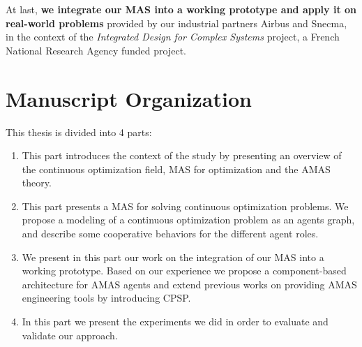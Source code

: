 At last, \textbf{we integrate our MAS into a working prototype and apply it on real-world problems} provided by our industrial partners Airbus and Snecma, in the context of the \emph{Integrated Design for Complex Systems} project, a French National Research Agency funded project.

\pagebreak
\section*{Manuscript Organization}
This thesis is divided into 4 parts:
\begin{enumerate}[P{a}rt I.] %
\item This part introduces the context of the study by presenting an overview of the continuous optimization field, MAS for optimization and the AMAS theory.
\item This part presents a MAS for solving continuous optimization problems. We propose a modeling of a continuous optimization problem as an agents graph, and describe some cooperative behaviors for the different agent roles.
\item We present in this part our work on the integration of our MAS into a working prototype. Based on our experience we propose a component-based architecture for AMAS agents and extend previous works on providing AMAS engineering tools by introducing CPSP.
\item In this part we present the experiments we did in order to evaluate and validate our approach.
\end{enumerate}
